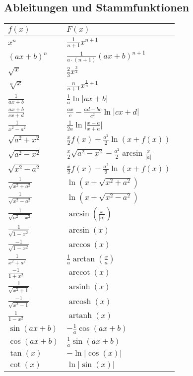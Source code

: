 \documentclass[a4paper,10pt]{scrartcl}
\begin{document}
\subsection{Ableitungen und Stammfunktionen}
\begin{multicols}{2}
	\renewcommand\arraystretch{1.4}
	\begin{tabular}{l|l}
		$f(x)$ & $F(x)$ \\ \hline
		
		$ x^n $   &   $ \frac{1}{n+1} x^{n+1} $ \\
		$ (ax+b)^n $  &  $ \frac{1}{a\cdot(n+1)} (ax+b)^{n+1} $ \\
		$ \sqrt x $  &  $ \frac{2}{3} x^{ \frac{3}{2} } $ \\
		$ \sqrt[n] x $  &  $ \frac{n}{n+1} x^{ \frac{1}{n}+1 } $ \\
		$ \frac{1}{ax+b} $  &  $ \frac{1}{a} \ln |ax+b| $ \\
		$ \frac{ax+b}{cx+d} $  &  $ \frac{ax}{c}-\frac{ad-bc}{c^2} \ln |cx+d| $ \\
		$ \frac{1}{x^2-a^2} $  &  $ \frac{1}{2a} \ln { \big| \frac{x-a}{x+a} \big| } $ \\
		$ \sqrt{a^2+x^2} $  &  $ \frac{x}{2} f(x) + \frac{a^2}{2} \ln ( x+f(x) ) $ \\
		$ \sqrt{a^2-x^2} $  &  $ \frac{x}{2} \sqrt{a^2-x^2} - \frac{a^2}{2} \arcsin \frac{x}{|a|}  $ \\
		$ \sqrt{x^2-a^2} $  &  $ \frac{x}{2} f(x) - \frac{a^2}{2} \ln {( x+f(x) )} $ \\
		$ \frac{1}{\sqrt{x^2+a^2}} $  &  $ \ln( x+\sqrt{x^2+a^2} ) $ \\
		$ \frac{1}{\sqrt{x^2-a^2}} $  &  $ \ln( x+\sqrt{x^2-a^2} ) $ \\
		$ \frac{1}{\sqrt{a^2-x^2}} $  &  $ \arcsin( \frac{x}{|a|} ) $ \\
		$ \frac{1}{\sqrt{1-x^2}} $  &  $ \arcsin( x ) $ \\
		$ \frac{-1}{\sqrt{1-x^2}} $  &  $ \arccos(x) $ \\
		$ \frac{1}{x^2+a^2} $  &  $ \frac{1}{a} \arctan(\frac{x}{a}) $ \\
		$ \frac{-1}{1+x^2} $  &  $ \operatorname{arccot}(x) $ \\
		$ \frac{1}{\sqrt{x^2+1}} $  &  $ \operatorname{arsinh} (x) $ \\
		$ \frac{-1}{\sqrt{x^2-1}} $  &  $ \operatorname{arcosh} (x) $ \\
		$ \frac{1}{1-x^2} $  &  $ \operatorname{artanh} (x) $ \\
		$ \sin(ax+b) $  &  $-\frac{1}{a}\cos(ax+b)  $ \\
		$ \cos(ax+b) $  &  $ \frac{1}{a}\sin(ax+b) $ \\
		$ \tan(x) $  &  $ -\ln|\cos(x)| $ \\
		$ \cot(x) $  &  $ \ln |\sin(x)| $ \\
	\end{tabular}
	

\end{multicols}
\end{document}
